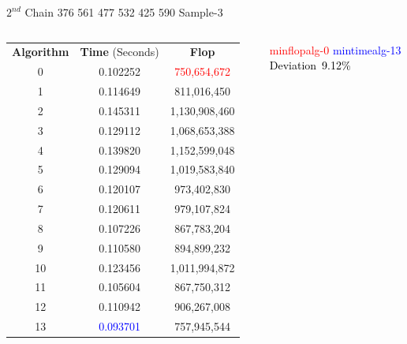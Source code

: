\documentclass[10pts]{beamer}
\begin{document}
	    \begin{frame}{$2^{nd}$ Chain 376 561 477 532 425 590 \hspace{75pt}   Sample-3 }
	    	\begin{columns}
	    		
	    		\begin{tabular}{c | c | c}
	    			\textbf{Algorithm}  & \textbf{Time} (Seconds) & \textbf{Flop}\\	
	    			0 &	0.102252 &	\textcolor{red}{750,654,672} 	\\	
	    			1 &	0.114649 &	811,016,450 	\\	
	    			2 &	0.145311 &	1,130,908,460 	\\	
	    			3 &	0.129112 &	1,068,653,388 	\\	
	    			4 &	0.139820 &	1,152,599,048 	\\	
	    			5 &	0.129094 &	1,019,583,840 	\\	
	    			6 &	0.120107 &	973,402,830 	\\	
	    			7 &	0.120611 &	979,107,824 	\\	
	    			8 &	0.107226 &	867,783,204 	\\	
	    			9 &	0.110580 &	894,899,232 	\\	
	    			10 &	0.123456& 	1,011,994,872 \\ 		
	    			11 	&0.105604 	&867,750,312 		 \\
	    			12 	&0.110942 	&906,267,008 		\\
	    			13 	& \textcolor{blue}{0.093701} 	&757,945,544	\\
	    			
	    		\end{tabular}
	    		
	    		
	    		\textcolor{red}{min\textunderscore flop\textunderscore alg-0}
	    		\textcolor{blue}{min\textunderscore time\textunderscore alg-13}
	    		\textcolor{black}{Deviation~9.12\%}
	    	\end{columns}
	    \end{frame} 
	    
	   
	   
	   
	   
	   
	   
	   
	   
	   
	   
	   
	   
	   
	   
	   
	  
\end{document}
